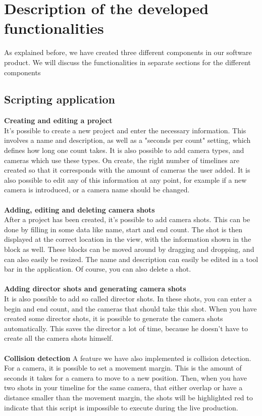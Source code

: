 \section{Description of the developed functionalities}

As explained before, we have created three different components in our software product. We will discuss the functionalities in separate sections for the different components

\subsection*{Scripting application}
\textbf{Creating and editing a project}\\
It's possible to create a new project and enter the necessary information. This involves a name and description, as well as a "seconds per count" setting, which defines how long one count takes. It is also possible to add camera types, and cameras which use these types. On create, the right number of timelines are created so that it corresponds with the amount of cameras the user added. It is also possible to edit any of this information at any point, for example if a new camera is introduced, or a camera name should be changed.\\\\
\textbf{Adding, editing and deleting camera shots}\\
After a project has been created, it's possible to add camera shots. This can be done by filling in some data like name, start and end count. The shot is then displayed at the correct location in the view, with the information shown in the block as well. These blocks can be moved around by dragging and dropping, and can also easily be resized. The name and description can easily be edited in a tool bar in the application. Of course, you can also delete a shot.\\\\
\textbf{Adding director shots and generating camera shots}\\
It is also possible to add so called director shots. In these shots, you can enter a begin and end count, and the cameras that should take this shot. When you have created some director shots, it is possible to generate the camera shots automatically. This saves the director a lot of time, because he doesn't have to create all the camera shots himself.\\\\
\textbf{Collision detection}
A feature we have also implemented is collision detection. For a camera, it is possible to set a movement margin. This is the amount of seconds it takes for a camera to move to a new position. Then, when you have two shots in your timeline for the same camera, that either overlap or have a distance smaller than the movement margin, the shots will be highlighted red to indicate that this script is impossible to execute during the live production.\\\\

